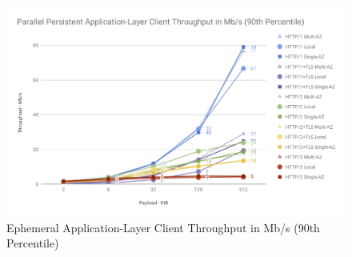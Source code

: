 \begin{figure}[h!]
    \centering
    \includegraphics[width=\linewidth]{figures/charts/Parallel Persistent Application-Layer Client Throughput in Mb_s (90th Percentile).png}
    \caption{Ephemeral Application-Layer Client Throughput in Mb/s (90th Percentile)}
    \label{fig:parallel_app_throughput}
\end{figure}
